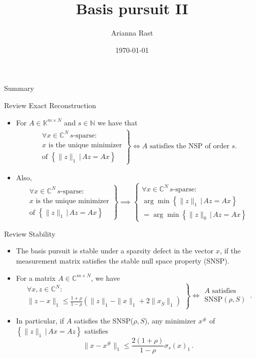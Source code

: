 \documentclass[11pt]{beamer}
\author[Autor]{Arianna Rast}
\title{Basis pursuit II}
\institute[]{LMU Munich}
\date{\today}
\newcommand{\CC}{\mathbb{C}}
\newcommand{\NN}{\mathbb{N}}
\newcommand{\KK}{\mathbb{K}}
\begin{document}
\begin{frame}
\titlepage
\end{frame}

\begin{frame}{Summary}
\tableofcontents 
\end{frame}

\begin{frame}{Review Exact Reconstruction}
\begin{itemize}
	\item For \(A\in \KK^{m\times N}\) and \(s\in \NN\) we have that
	\begin{align*}
	\left.\begin{array}{c}
		\forall x\in \CC^N\,s\text{-sparse}:\\
		x\text{ is the unique minimizer} \\  \text{of }
		\left\{\|z\|_1\,\big|\, Az=Ax\right\}
	\end{array}\right\}
\iff  A\text{ satisfies the NSP of order }s.
\end{align*}
\item Also, 
\[\left.\begin{array}{c}
		\forall x\in \CC^N\,s\text{-sparse}:\\
		x\text{ is the unique minimizer} \\  \text{of }
		\left\{\|z\|_1\,\big|\, Az=Ax\right\}
	\end{array}\right\} \implies \left\{\begin{array}{c}
		\forall x\in \CC^N\,s\text{-sparse}:\\
		\arg\min\left\{\|z\|_1\,\big|\,Az=Ax\right\}\\
		=\arg\min\left\{\|z\|_0\,\big|\,Az=Ax\right\}
	\end{array}\right.
\]

\end{itemize}
\end{frame}

\begin{frame}{Review Stability}
	\begin{itemize}
		\item The basis pursuit is stable under a sparsity defect in the vector \(x\), if the measurement matrix satisfies the stable null space property (SNSP).
		\item For a matrix \(A\in\CC^{m\times N}\), we have
\[\left.\begin{array}{c}
\forall x,z\in \CC^N:\\
\|z-x\|_1\le \frac{1+\rho}{1-\rho}\left(\|z\|_1-\|x\|_1+2\|x_{\overline{S}}\|_1\right)
\end{array}\right\}
\iff 
\begin{array}{c}
A\text{ satisfies}\\
\text{SNSP}(\rho,S)
\end{array}
\,.\]
\item In particular, if \(A\) satisfies the SNSP($\rho,S$), any minimizer \(x^{\#}\) of \(\left\{\|z\|_1\,\big|\,Ax=Az\right\}\) satisfies 
\[\|x-x^{\#}\|_1\le \frac{2(1+\rho)}{1-\rho}\sigma_s(x)_1\,.\]
	\end{itemize}
\end{frame}
\end{document}
